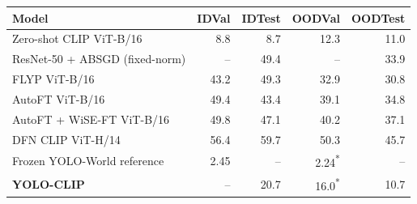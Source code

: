 \begin{tabular}{lrrrr}
\toprule
Model & IDVal & IDTest & OODVal & OODTest \\
\midrule
Zero-shot CLIP ViT-B/16 & 8.8 & 8.7 & 12.3 & 11.0 \\
ResNet-50 + ABSGD (fixed-norm) & -- & 49.4 & -- & 33.9 \\
FLYP ViT-B/16 & 43.2 & 49.3 & 32.9 & 30.8 \\
AutoFT ViT-B/16 & 49.4 & 43.4 & 39.1 & 34.8 \\
AutoFT + WiSE-FT ViT-B/16 & 49.8 & 47.1 & 40.2 & 37.1 \\
DFN CLIP ViT-H/14 & 56.4 & 59.7 & 50.3 & 45.7 \\
\midrule
Frozen YOLO-World reference & 2.45 & -- & 2.24\textsuperscript{*} & -- \\
\textbf{YOLO-CLIP} & -- & 20.7 & 16.0\textsuperscript{*} & 10.7 \\
\bottomrule
\end{tabular}
